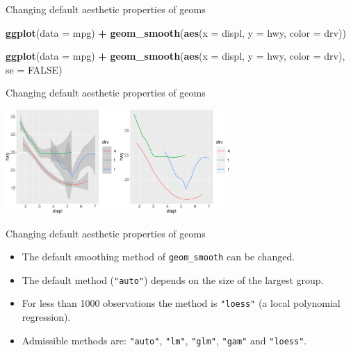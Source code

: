 \documentclass[ignorenonframetext,]{beamer}
\newenvironment{Shaded}{\begin{snugshade}}{\end{snugshade}}
\newcommand{\DataTypeTok}[1]{\textcolor[rgb]{0.13,0.29,0.53}{#1}}
\newcommand{\KeywordTok}[1]{\textcolor[rgb]{0.13,0.29,0.53}{\textbf{#1}}}
\newcommand{\NormalTok}[1]{#1}
\newcommand{\OperatorTok}[1]{\textcolor[rgb]{0.81,0.36,0.00}{\textbf{#1}}}
\newcommand{\OtherTok}[1]{\textcolor[rgb]{0.56,0.35,0.01}{#1}}
\newcommand{\StringTok}[1]{\textcolor[rgb]{0.31,0.60,0.02}{#1}}
\begin{document}
\begin{frame}[fragile]{Changing default aesthetic properties of geoms}
\protect\hypertarget{changing-default-aesthetic-properties-of-geoms-29}{}

\begin{Shaded}
\begin{Highlighting}[]
\KeywordTok{ggplot}\NormalTok{(}\DataTypeTok{data =}\NormalTok{ mpg) }\OperatorTok{+}\StringTok{ }
\StringTok{  }\KeywordTok{geom_smooth}\NormalTok{(}\KeywordTok{aes}\NormalTok{(}\DataTypeTok{x =}\NormalTok{ displ, }\DataTypeTok{y =}\NormalTok{ hwy, }\DataTypeTok{color =}\NormalTok{ drv))}

\KeywordTok{ggplot}\NormalTok{(}\DataTypeTok{data =}\NormalTok{ mpg) }\OperatorTok{+}\StringTok{ }
\StringTok{  }\KeywordTok{geom_smooth}\NormalTok{(}\KeywordTok{aes}\NormalTok{(}\DataTypeTok{x =}\NormalTok{ displ, }\DataTypeTok{y =}\NormalTok{ hwy, }\DataTypeTok{color =}\NormalTok{ drv),}
    \DataTypeTok{se =} \OtherTok{FALSE}\NormalTok{)}
\end{Highlighting}
\end{Shaded}

\end{frame}

\begin{frame}{Changing default aesthetic properties of geoms}
\protect\hypertarget{changing-default-aesthetic-properties-of-geoms-30}{}

\begin{center}\includegraphics[height=150px]{data-visualization_files/figure-beamer/unnamed-chunk-63-1} \end{center}

\end{frame}

\begin{frame}[fragile]{Changing default aesthetic properties of geoms}
\protect\hypertarget{changing-default-aesthetic-properties-of-geoms-31}{}

\begin{itemize}
\item
  The default smoothing method of \texttt{geom\_smooth} can be changed.
\item
  The default method (\texttt{"auto"}) depends on the size of the
  largest group.
\item
  For less than 1000 observations the method is \texttt{"loess"} (a
  local polynomial regression).
\item
  Admissible methods are: \texttt{"auto"}, \texttt{"lm"},
  \texttt{"glm"}, \texttt{"gam"} and \texttt{"loess"}.
\end{itemize}

\end{frame}
\end{document}
